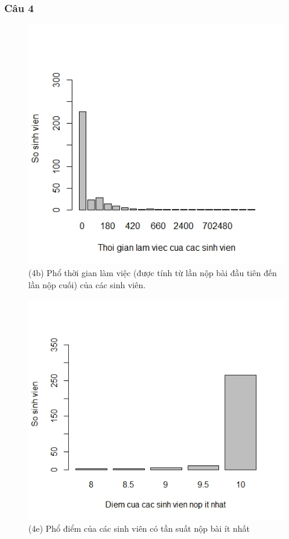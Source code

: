 \documentclass[a4paper]{article}
\theoremstyle{definition}
\begin{document}
\subsubsection{Câu 4}
\begin{figure}[!ht]
    \centering
    \includegraphics[scale=0.4]{Pics/q4b-file1.jpeg}
    \caption{(4b) Phổ thời gian làm việc (được tính từ lần nộp bài đầu tiên đến lần nộp cuối) của các
sinh viên.}
    \label{fig:my_label}
\end{figure}
\newpage
\begin{figure}[!ht]
    \centering
    \includegraphics[scale=0.4]{Pics/q4e-file4.jpeg}
    \caption{(4e) Phổ điểm của các sinh viên có tần suất nộp bài ít nhất}
    \label{fig:my_label}
\end{figure}
\end{document}
